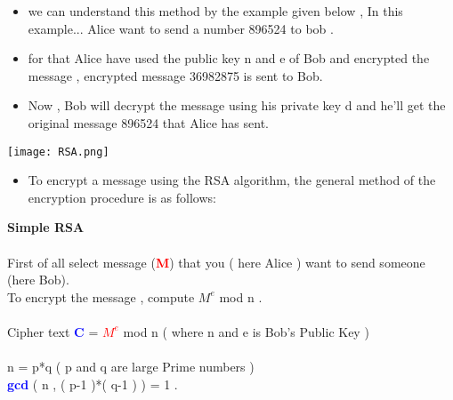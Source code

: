 \documentclass{article}
\begin{document}
\begin{itemize}
\item we can understand this method by the example given below , In this example... Alice want to send a number 896524 to bob .
\end{itemize}

\begin{itemize}
\item for that Alice have used the public key n and e of Bob and encrypted the message , encrypted message 36982875 is sent to Bob.
\end{itemize}

\begin{itemize}
\item Now , Bob will decrypt the message using his private key d and he'll get the original message 896524 that Alice has sent.
\end{itemize}
\pagebreak


\begin{center}
\texttt{[image: RSA.png]} 
\end{center}

\vspace{0.5cm}

\begin{itemize}
\item To encrypt a message using the RSA algorithm, the general method of the encryption procedure is as follows: 
\end{itemize}

\begin{tcolorbox}

\textbf{Simple RSA}\\\\
 First of all select message (\textcolor{red}{\textbf{M}}) that you ( here Alice ) want to send someone (here Bob).\\
 To encrypt the message , compute \( M^e \) mod n .\\\\

                 Cipher text \textcolor{blue}{\textbf{C}} = \textcolor{red}{\( M^e \)} mod n    \hspace{0.5cm} ( where n and e is Bob's Public Key )\\\\

     n = p*q    ( p and q are large Prime numbers ) \\
    \textbf{ \textcolor{blue}{gcd}} ( n , ( p-1 )*( q-1 ) ) = 1 .\\
    
    \end{tcolorbox}
    
\end{document}
